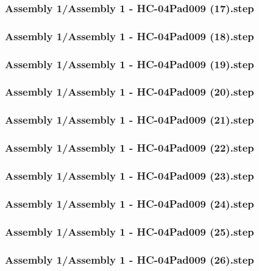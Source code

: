 \documentclass[a4paper,12pt]{article}
\begin{document}
\subsubsection{Assembly 1/Assembly 1 - HC-04Pad009 (17).step}

\subsubsection{Assembly 1/Assembly 1 - HC-04Pad009 (18).step}

\subsubsection{Assembly 1/Assembly 1 - HC-04Pad009 (19).step}

\subsubsection{Assembly 1/Assembly 1 - HC-04Pad009 (20).step}

\subsubsection{Assembly 1/Assembly 1 - HC-04Pad009 (21).step}

\subsubsection{Assembly 1/Assembly 1 - HC-04Pad009 (22).step}

\subsubsection{Assembly 1/Assembly 1 - HC-04Pad009 (23).step}

\subsubsection{Assembly 1/Assembly 1 - HC-04Pad009 (24).step}

\subsubsection{Assembly 1/Assembly 1 - HC-04Pad009 (25).step}

\subsubsection{Assembly 1/Assembly 1 - HC-04Pad009 (26).step}

\end{document}
